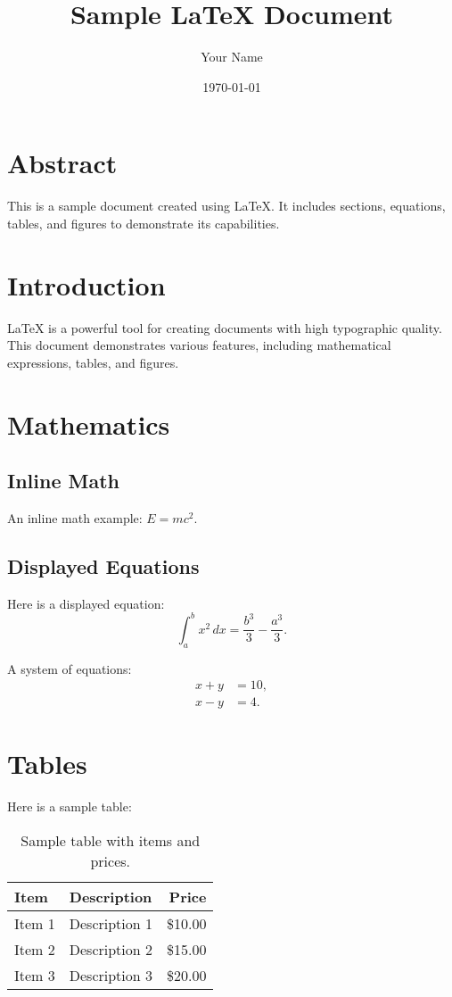 \documentclass{article}
\title{Sample \LaTeX{} Document}
\author{Your Name}
\date{\today}
\begin{document}
\maketitle

\section*{Abstract}
This is a sample document created using \LaTeX{}. It includes sections, equations, tables, and figures to demonstrate its capabilities.

\section{Introduction}
\LaTeX{} is a powerful tool for creating documents with high typographic quality. This document demonstrates various features, including mathematical expressions, tables, and figures.

\section{Mathematics}
\subsection{Inline Math}
An inline math example: $E = mc^2$.

\subsection{Displayed Equations}
Here is a displayed equation:
\begin{equation}
\int_a^b x^2 \, dx = \frac{b^3}{3} - \frac{a^3}{3}.
\end{equation}

A system of equations:
\begin{align}
x + y &= 10, \\
x - y &= 4.
\end{align}

\section{Tables}
Here is a sample table:
\begin{table}[h!]
\centering
\begin{tabular}{llr}
\toprule
\textbf{Item} & \textbf{Description} & \textbf{Price} \\
\midrule
Item 1 & Description 1 & \$10.00 \\
Item 2 & Description 2 & \$15.00 \\
Item 3 & Description 3 & \$20.00 \\
\bottomrule
\end{tabular}
\caption{Sample table with items and prices.}
\label{tab:sample_table}
\end{table}
\end{document}
